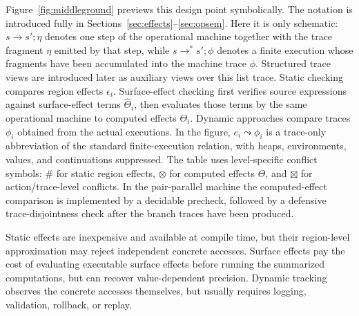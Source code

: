 \documentclass[10pt,a4paper]{article}
\newcommand{\thetahat}{\widehat{\Theta}}
\begin{document}
Figure~\ref{fig:middleground} previews this design point symbolically.  The
notation is introduced fully in Sections~\ref{sec:effects}--\ref{sec:opsem}.
Here it is only schematic: $s\longrightarrow s';\eta$ denotes one step of the
operational machine together with the trace fragment $\eta$ emitted by that
step, while $s\longrightarrow^{*}s';\phi$ denotes a finite execution whose
fragments have been accumulated into the machine trace $\phi$. Structured trace
views are introduced later as auxiliary views over this list trace. Static
checking compares region effects $\epsilon_i$. Surface-effect checking first
verifies source expressions against surface-effect terms $\thetahat_i$, then
evaluates those terms by the same operational machine to computed effects
$\Theta_i$. Dynamic approaches compare traces $\phi_i$ obtained from the
actual executions. In the figure, $e_i\leadsto\phi_i$ is a
trace-only abbreviation of the standard finite-execution relation, with heaps,
environments, values, and continuations suppressed.
The table uses level-specific conflict symbols: $\#$ for static
region effects, $\otimes$ for computed effects $\Theta$, and $\boxtimes$ for
action/trace-level conflicts. In the pair-parallel machine the computed-effect
comparison is implemented by a decidable precheck, followed by a defensive
trace-disjointness check after the branch traces have been produced.

Static effects are inexpensive and available at compile time, but their
region-level approximation may reject independent concrete accesses. Surface
effects pay the cost of evaluating executable surface effects before running the
summarized computations, but can recover value-dependent precision. Dynamic tracking
observes the concrete accesses themselves, but usually requires logging,
validation, rollback, or replay.
\end{document}

